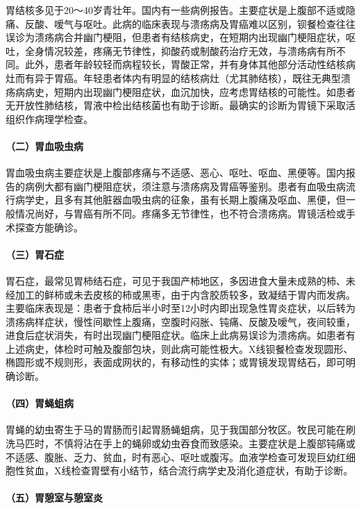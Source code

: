 胃结核多见于20～40岁青壮年。国内有一些病例报告。主要症状是上腹部不适或隐痛、反酸、嗳气与呕吐。此病的临床表现与溃疡病及胃癌难以区别，钡餐检查往往误诊为溃疡病合并幽门梗阻，但患者有结核病史，在短期内出现幽门梗阻症状，呕吐，全身情况较差，疼痛无节律性，抑酸药或制酸药治疗无效，与溃疡病有所不同。此外，患者年龄较轻而病程较长，胃酸正常，并有身体其他部分活动性结核病灶而有异于胃癌。年轻患者体内有明显的结核病灶（尤其肺结核），既往无典型溃疡病病史，短期内出现幽门梗阻症状，血沉加快，应考虑胃结核的可能性。如患者无开放性肺结核，胃液中检出结核菌也有助于诊断。最确实的诊断为胃镜下采取活组织作病理学检查。

\paragraph{（二）胃血吸虫病}

胃血吸虫病主要症状是上腹部疼痛与不适感、恶心、呕吐、呕血、黑便等。国内报告的病例大都有幽门梗阻症状，须注意与溃疡病及胃癌等鉴别。患者有血吸虫病流行病学史，且多有其他脏器血吸虫病的征象，虽有长期上腹痛及呕血、黑便，但一般情况尚好，与胃癌有所不同。疼痛多无节律性，也不符合溃疡病。胃镜活检或手术探查方能确诊。

\paragraph{（三）胃石症}

胃石症，最常见胃柿结石症，可见于我国产柿地区，多因进食大量未成熟的柿、未经加工的鲜柿或未去皮核的柿或黑枣，由于内含胶质较多，致凝结于胃内而发病。主要临床表现是：患者于食柿后半小时至12小时内即出现急性胃炎症状，以后转为溃疡病样症状，慢性间歇性上腹痛，空腹时闷胀、钝痛、反酸及嗳气，夜间较重，进食后症状消失，有时出现幽门梗阻症状。临床上此病易误诊为溃疡病。如患者有上述病史，体检时可触及腹部包块，则此病可能性极大。X线钡餐检查发现圆形、椭圆形或不规则形，表面成网状的，有移动性的实体；或胃镜发现胃结石，即可明确诊断。

\paragraph{（四）胃蝇蛆病}

胃蝇的幼虫寄生于马的胃肠而引起胃肠蝇蛆病，见于我国部分牧区。牧民可能在刷洗马匹时，不慎将沾在手上的蝇卵或幼虫吞食而致感染。主要症状是上腹部钝痛或不适感、腹胀、乏力、贫血，时有恶心、呕吐或腹泻。血液学检查可发现巨幼红细胞性贫血，X线检查胃壁有小结节，结合流行病学史及消化道症状，有助于诊断。

\paragraph{（五）胃憩室与憩室炎}

